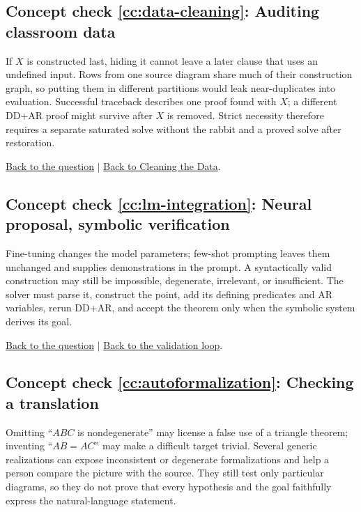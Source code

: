 \documentclass[reqno]{amsart}
\DeclareMathOperator{\1}{\textbf{1}}
\begin{document}
\hypertarget{cca:data-cleaning}{}
\subsection*{Concept check \ref{cc:data-cleaning}: Auditing classroom data}

If $X$ is constructed last, hiding it cannot leave a later clause that uses an
undefined input. Rows from one source diagram share much of their construction
graph, so putting them in different partitions would leak near-duplicates into
evaluation. Successful traceback describes one proof found with $X$; a
different DD+AR proof might survive after $X$ is removed. Strict necessity
therefore requires a separate saturated solve without the rabbit and a proved
solve after restoration.

\noindent\hyperlink{ccq:data-cleaning}{Back to the question}
$\mid$
\hyperref[sec: Cleaning the data]{Back to Cleaning the Data}.

\hypertarget{cca:lm-integration}{}
\subsection*{Concept check \ref{cc:lm-integration}: Neural proposal, symbolic verification}

Fine-tuning changes the model parameters; few-shot prompting leaves them
unchanged and supplies demonstrations in the prompt. A syntactically valid
construction may still be impossible, degenerate, irrelevant, or
insufficient. The solver must parse it, construct the point, add its defining
predicates and AR variables, rerun DD+AR, and accept the theorem only when the
symbolic system derives its goal.

\noindent\hyperlink{ccq:lm-integration}{Back to the question}
$\mid$
\hyperref[sec: Integrating the language model]{Back to the validation loop}.

\hypertarget{cca:autoformalization}{}
\subsection*{Concept check \ref{cc:autoformalization}: Checking a translation}

Omitting ``$ABC$ is nondegenerate'' may license a false use of a triangle
theorem; inventing ``$AB=AC$'' may make a difficult target trivial. Several
generic realizations can expose inconsistent or degenerate formalizations and
help a person compare the picture with the source. They still test only
particular diagrams, so they do not prove that every hypothesis and the goal
faithfully express the natural-language statement.
\end{document}
